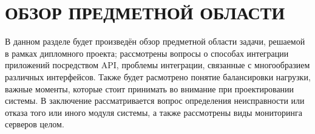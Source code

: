 \section{ОБЗОР ПРЕДМЕТНОЙ ОБЛАСТИ}

В данном разделе будет произведён обзор предметной области задачи, решаемой в рамках дипломного проекта; рассмотрены вопросы о способах интеграции приложений посредством API, проблемы интеграции, связанные с многообразием различных интерфейсов. Также будет расмотрено понятие балансировки нагрузки, важные моменты, которые стоит принимать во внимание при проектировании системы. В заключение рассматривается вопрос определения неисправности или отказа того или иного модуля системы, а также рассмотрены виды мониторинга серверов целом.

\newpage
